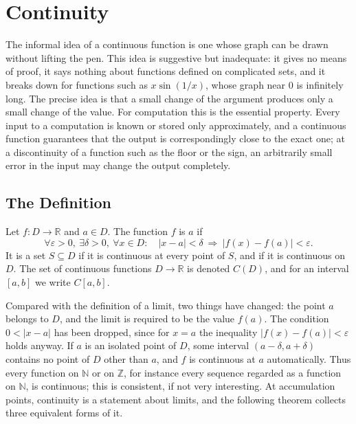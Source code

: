 \section{Continuity}
\label{sec:continuity}

The informal idea of a continuous function is one whose graph can be drawn without lifting the pen. This idea is suggestive but inadequate: it gives no means of proof, it says nothing about functions defined on complicated sets, and it breaks down for functions such as $x\sin(1/x)$, whose graph near $0$ is infinitely long. The precise idea is that a small change of the argument produces only a small change of the value. For computation this is the essential property. Every input to a computation is known or stored only approximately, and a continuous function guarantees that the output is correspondingly close to the exact one; at a discontinuity of a function such as the floor or the sign, an arbitrarily small error in the input may change the output completely.

\subsection{The Definition}

\begin{definition}[Continuity]
\label{def:continuity}
Let $f\colon D\to\mathbb R$ and $a\in D$. The function $f$ is  $a$ if
\begin{equation}
\forall\varepsilon>0,\ \exists\delta>0,\ \forall x\in D:\quad|x-a|<\delta\ \Rightarrow\ |f(x)-f(a)|<\varepsilon .
\label{eq:continuity}
\end{equation}
It is  a set $S\subseteq D$ if it is continuous at every point of $S$, and  if it is continuous on $D$. The set of continuous functions $D\to\mathbb R$ is denoted $C(D)$, and for an interval $[a,b]$ we write $C[a,b]$.
\end{definition}

Compared with the definition of a limit, two things have changed: the point $a$ belongs to $D$, and the limit is required to be the value $f(a)$. The condition $0<|x-a|$ has been dropped, since for $x=a$ the inequality $|f(x)-f(a)|<\varepsilon$ holds anyway. If $a$ is an isolated point of $D$, some interval $(a-\delta,a+\delta)$ contains no point of $D$ other than $a$, and $f$ is continuous at $a$ automatically. Thus every function on $\mathbb N$ or on $\mathbb Z$, for instance every sequence regarded as a function on $\mathbb N$, is continuous; this is consistent, if not very interesting. At accumulation points, continuity is a statement about limits, and the following theorem collects three equivalent forms of it.

